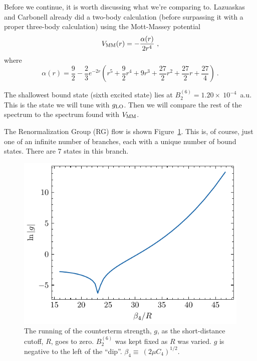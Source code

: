 \documentclass{article}
\begin{document}
Before we continue, it is worth discussing what we're comparing to.
Lazuaskas and Carbonell already did a two-body calculation (before surpassing
it with a proper three-body calculation) using the Mott-Massey potential
\begin{equation}
  \label{eq:mott_massey}
  V_{\rm MM}(r) = -\frac{\alpha(r)}{2r^4}~,
\end{equation}
where 
\begin{equation}
  \label{eq:alpha}
  \alpha(r) = \frac{9}{2} - \frac{2}{3} e^{-2r}\left( r^5 + \frac{9}{2}r^4 +
  9r^3 + \frac{27}{2}r^2 + \frac{27}{2}r + \frac{27}{4} \right)~.
\end{equation}

The shallowest bound state (sixth excited state) lies at $B_2^{(6)}=1.20\times~10^{-4}$~a.u.
This is the state we will tune with $g_{\rm LO}$.
Then we will compare the rest of the spectrum to the spectrum found with $V_{\rm
MM}$.

The Renormalization Group (RG) flow is shown Figure~\ref{fig:rg_flow}.
This is, of course, just one of an infinite number of branches, each with a unique
number of bound states. 
There are 7 states in this branch.

\begin{figure}
  \centering
  \includegraphics{figures/rg_flow.pdf}
  \caption{The running of the counterterm strength, $g$, as the short-distance
  cutoff, $R$, goes to zero. $B_2^{(6)}$ was kept fixed as $R$ was varied. $g$
is negative to the left of the ``dip''. $\beta_4\equiv~(2\mu
C_4)^{1/2}$.}\label{fig:rg_flow}
\end{figure}
\end{document}
